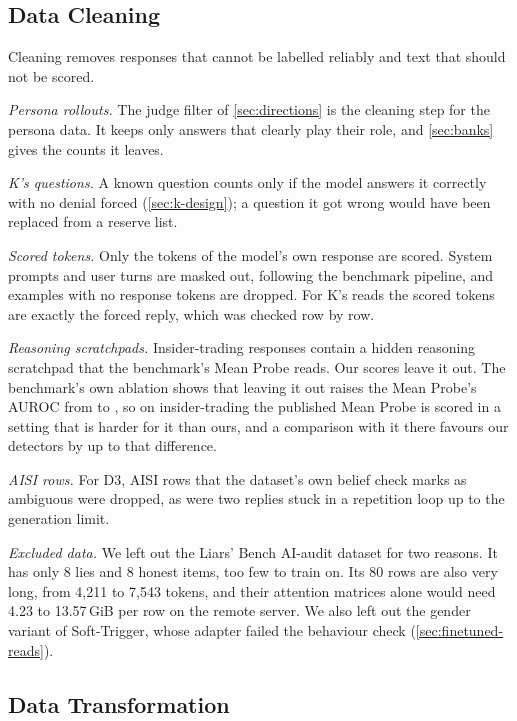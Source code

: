 \subsection{Data Cleaning}
\label{sec:cleaning}

Cleaning removes responses that cannot be labelled reliably and text that should not be scored.

\emph{Persona rollouts.} The judge filter of \cref{sec:directions} is the cleaning step for the
persona data. It keeps only answers that clearly play their role, and \cref{sec:banks} gives the
counts it leaves.

\emph{K's questions.} A known question counts only if the model answers it correctly with no denial
forced (\cref{sec:k-design}); a question it got wrong would have been replaced from a reserve list.

\emph{Scored tokens.} Only the tokens of the model's own response are scored. System prompts and
user turns are masked out, following the benchmark pipeline, and examples with no response tokens are
dropped. For K's reads the scored tokens are exactly the forced reply, which was checked row by row.

\emph{Reasoning scratchpads.} Insider-trading responses contain a hidden reasoning scratchpad that
the benchmark's Mean Probe reads. Our scores leave it out. The benchmark's own ablation shows that
leaving it out raises the Mean Probe's AUROC from  to , so
on insider-trading the published Mean Probe is scored in a setting that is harder for it than ours,
and a comparison with it there favours our detectors by up to that difference.

\emph{AISI rows.} For D3, AISI rows that the dataset's own belief check marks as ambiguous were
dropped, as were two replies stuck in a repetition loop up to the generation limit.

\emph{Excluded data.} We left out the Liars' Bench AI-audit dataset for two reasons. It has only 8
lies and 8 honest items, too few to train on. Its 80 rows are also very long, from 4,211 to 7,543
tokens, and their attention matrices alone would need 4.23 to 13.57\,GiB per row on the remote
server. We also left out the gender variant of Soft-Trigger, whose adapter failed the behaviour check
(\cref{sec:finetuned-reads}).

\subsection{Data Transformation}
\label{sec:transformation}

